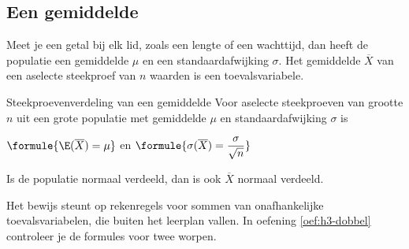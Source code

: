 
\begin{oefeningen}
\end{oefeningen}

\subsection{Een gemiddelde}

Meet je een getal bij elk lid, zoals een lengte of een wachttijd, dan heeft de populatie een gemiddelde $\mu$ en een standaardafwijking $\sigma$. Het gemiddelde $\overline{X}$ van een aselecte steekproef van $n$ waarden is een toevalsvariabele.

\begin{theorie}
\begin{stelling}{Steekproevenverdeling van een gemiddelde}
Voor aselecte steekproeven van grootte $n$ uit een grote populatie met gemiddelde $\mu$ en standaardafwijking $\sigma$ is

\vspace{1mm}
\qquad $\formule{\E(\overline{X}) = \mu}$ \qquad en \qquad $\formule{\sigma(\overline{X}) = \dfrac{\sigma}{\sqrt{n}}}$

\vspace{1mm}
Is de populatie normaal verdeeld, dan is ook $\overline{X}$ normaal verdeeld.
\end{stelling}
\end{theorie}

Het bewijs steunt op rekenregels voor sommen van onafhankelijke toevalsvariabelen, die buiten het leerplan vallen. In oefening \ref{oef:h3-dobbel} controleer je de formules voor twee worpen.

